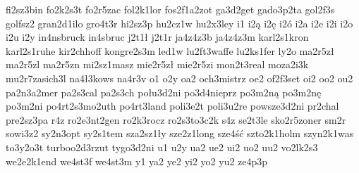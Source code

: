 {fi2sz3bin
fo2k2s3t
fo2r5zac
fol2k1lor
fos2f1a2zot
ga3d2get
gado3p2ta
gol2f3s
golfsz2
gran2d1ilo
gro4t3r
hi2sz3p
hu2cz1w
hu2x3ley
i1
i2ą
i2ę
i2ó
i2a
i2e
i2i
i2o
i2u
i2y
in4nsbruck
in4sbruc
j2t1ł
j2t1r
ja4z4z3b
ja4z4z3m
karl2s1kron
karl2s1ruhe
kir2chhoff
kongre2s3m
led1w
lu2ft3waffe
lu2ks1fer
ly2o
ma2r5zł
ma2r5zl
ma2r5zn
mi2sz1masz
mie2r5zł
mie2r5zi
mon2t3real
moza2i3k
mu2r7zasich3l
na4ł3kows
na4r3v
o1
o2y
oa2
och3mistrz
oe2
of2f3set
oi2
oo2
ou2
pa2n3a2mer
pa2s3cal
pa2s3ch
połu3d2ni
po3d4nieprz
po3m2ną
po3m2nę
po3m2ni
po4rt2s3mo2uth
po4rt3land
poli3e2t
poli3u2re
powsze3d2ni
pr2chal
pre2sz3pa
r4z
ro2e3nt2gen
ro2k3rocz
ro2s3to3c2k
s4z
se2t3le
sko2r5zoner
sm2r
sowi3z2
sy2n3opt
sy2s1tem
sza2sz1ły
sze2z1long
sze4ść
szto2k1holm
szyn2k1was
to3y2o3t
turboo2d3rzut
tygo3d2ni
u1
u2y
ua2
ue2
ui2
uo2
uu2
vo2lk2s3
we2e2k1end
we4st3f
we4st3m
y1
ya2
ye2
yi2
yo2
yu2
ze4p3p
}
